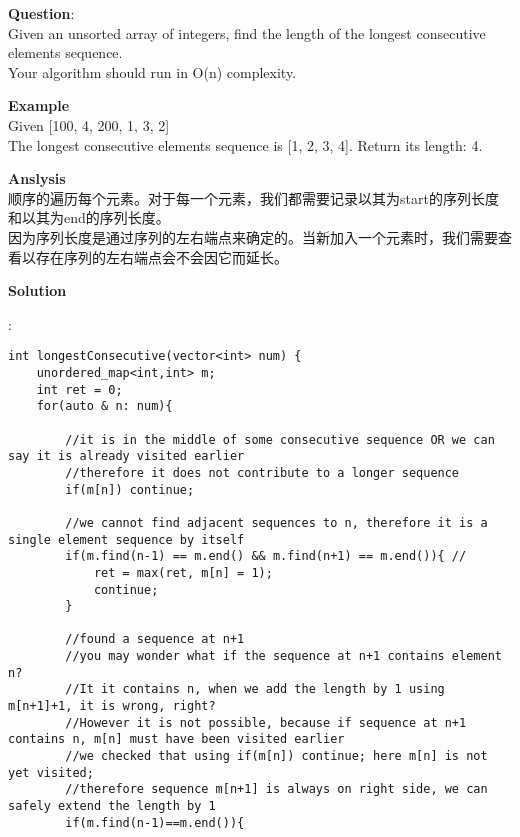\begin{description}
    \item{\textbf{Question}}:\\%
		Given an unsorted array of integers, find the length of the longest consecutive elements sequence.\\
		Your algorithm should run in O(n) complexity.\\

    \item{\textbf{Example}}\\
		Given [100, 4, 200, 1, 3, 2]\\
		The longest consecutive elements sequence is [1, 2, 3, 4]. Return its length: 4.\\

    \item{\textbf{Anslysis}}\\
		顺序的遍历每个元素。对于每一个元素，我们都需要记录以其为start的序列长度和以其为end的序列长度。\\
		因为序列长度是通过序列的左右端点来确定的。当新加入一个元素时，我们需要查看以存在序列的左右端点会不会因它而延长。\\

    \item{\textbf{Solution}}\\
	\item{} : \\
		\begin{lstlisting}
int longestConsecutive(vector<int> num) {
    unordered_map<int,int> m;
    int ret = 0;
    for(auto & n: num){

        //it is in the middle of some consecutive sequence OR we can say it is already visited earlier
        //therefore it does not contribute to a longer sequence
        if(m[n]) continue; 

        //we cannot find adjacent sequences to n, therefore it is a single element sequence by itself
        if(m.find(n-1) == m.end() && m.find(n+1) == m.end()){ // 
            ret = max(ret, m[n] = 1);
            continue;
        }

        //found a sequence at n+1
        //you may wonder what if the sequence at n+1 contains element n?
        //It it contains n, when we add the length by 1 using m[n+1]+1, it is wrong, right?
        //However it is not possible, because if sequence at n+1 contains n, m[n] must have been visited earlier
        //we checked that using if(m[n]) continue; here m[n] is not yet visited;
        //therefore sequence m[n+1] is always on right side, we can safely extend the length by 1
        if(m.find(n-1)==m.end()){ 


\end{lstlisting}
\end{description}
